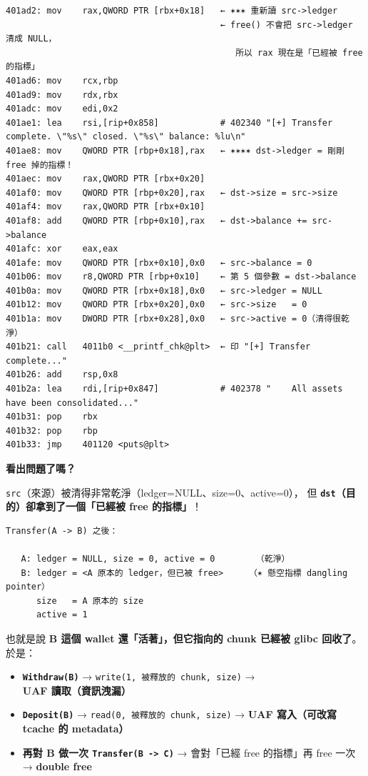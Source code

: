 \documentclass[10pt,a4paper]{article}
\providecommand{\tightlist}{%
  \setlength{\itemsep}{0pt}\setlength{\parskip}{0pt}}
\begin{document}
\begin{Verbatim}[breaklines=true,breakanywhere=true,breakautoindent=false,fontsize=\fontsize{7.0}{9.5}\selectfont]
401ad2: mov    rax,QWORD PTR [rbx+0x18]   ← ✶✶✶ 重新讀 src->ledger
                                          ← free() 不會把 src->ledger 清成 NULL，
                                             所以 rax 現在是「已經被 free 的指標」
401ad6: mov    rcx,rbp
401ad9: mov    rdx,rbx
401adc: mov    edi,0x2
401ae1: lea    rsi,[rip+0x858]            # 402340 "[+] Transfer complete. \"%s\" closed. \"%s\" balance: %lu\n"
401ae8: mov    QWORD PTR [rbp+0x18],rax   ← ✶✶✶✶ dst->ledger = 剛剛 free 掉的指標！
401aec: mov    rax,QWORD PTR [rbx+0x20]
401af0: mov    QWORD PTR [rbp+0x20],rax   ← dst->size = src->size
401af4: mov    rax,QWORD PTR [rbx+0x10]
401af8: add    QWORD PTR [rbp+0x10],rax   ← dst->balance += src->balance
401afc: xor    eax,eax
401afe: mov    QWORD PTR [rbx+0x10],0x0   ← src->balance = 0
401b06: mov    r8,QWORD PTR [rbp+0x10]    ← 第 5 個參數 = dst->balance
401b0a: mov    QWORD PTR [rbx+0x18],0x0   ← src->ledger = NULL
401b12: mov    QWORD PTR [rbx+0x20],0x0   ← src->size   = 0
401b1a: mov    DWORD PTR [rbx+0x28],0x0   ← src->active = 0（清得很乾淨）
401b21: call   4011b0 <__printf_chk@plt>  ← 印 "[+] Transfer complete..."
401b26: add    rsp,0x8
401b2a: lea    rdi,[rip+0x847]            # 402378 "    All assets have been consolidated..."
401b31: pop    rbx
401b32: pop    rbp
401b33: jmp    401120 <puts@plt>
\end{Verbatim}

\textbf{看出問題了嗎？}

\texttt{src}（來源）被清得非常乾淨（ledger=NULL、size=0、active=0）， 但
\textbf{\texttt{dst}（目的）卻拿到了一個「已經被 free 的指標」}！

\begin{Verbatim}[breaklines=true,breakanywhere=true,breakautoindent=false,fontsize=\fontsize{7.0}{9.5}\selectfont]
   Transfer(A -> B) 之後：

   A: ledger = NULL, size = 0, active = 0        （乾淨）
   B: ledger = <A 原本的 ledger，但已被 free>     （✶ 懸空指標 dangling pointer）
      size   = A 原本的 size
      active = 1
\end{Verbatim}

也就是說 \textbf{B 這個 wallet 還「活著」，但它指向的 chunk 已經被 glibc
回收了}。於是：

\begin{itemize}
\tightlist
\item
  \textbf{\texttt{Withdraw(B)}} →
  \texttt{write(1,\allowbreak{}\ \allowbreak{}被釋放的\ \allowbreak{}chunk,\allowbreak{}\ \allowbreak{}size)} → \textbf{UAF
  讀取（資訊洩漏）}
\item
  \textbf{\texttt{Deposit(B)}} →
  \texttt{read(0,\allowbreak{}\ \allowbreak{}被釋放的\ \allowbreak{}chunk,\allowbreak{}\ \allowbreak{}size)} → \textbf{UAF 寫入（可改寫
  tcache 的 metadata）}
\item
  \textbf{再對 B 做一次 \texttt{Transfer(B\ \allowbreak{}-\allowbreak{}\textgreater{}\allowbreak{}\ \allowbreak{}C)}} →
  會對「已經 free 的指標」再 free 一次 → \textbf{double free}
\end{itemize}
\end{document}
